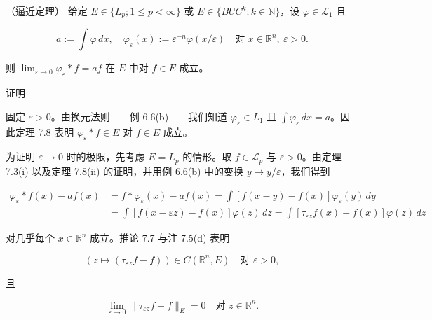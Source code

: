 \begin{theorem}

（逼近定理） 给定 $ E \in \{ L_{p} ; 1 \le p < \infty \} $ 或 $ E \in \{ BUC^{k} ; k \in \mathbb{N} \} $，设 $ \varphi \in \mathcal{L}_{1} $ 且

\[
a := \int \varphi\,dx , \quad \varphi_{\varepsilon}(x) := \varepsilon^{-n}\varphi(x/\varepsilon) \quad \text{对 } x \in \mathbb{R}^{n} , \ \varepsilon > 0 .
\]

则 $ \lim_{\varepsilon \to 0}\varphi_{\varepsilon} * f = af $ 在 $ E $ 中对 $ f \in E $ 成立。

证明

\begin{subitems}
\item

固定 $ \varepsilon > 0 $。由换元法则——例 6.6(b)——我们知道 $ \varphi_{\varepsilon} \in L_{1} $ 且 $ \int \varphi_{\varepsilon}\,dx = a $。因此定理 7.8 表明 $ \varphi_{\varepsilon} * f \in E $ 对 $ f \in E $ 成立。

\item

为证明 $ \varepsilon \to 0 $ 时的极限，先考虑 $ E = L_{p} $ 的情形。取 $ f \in \mathcal{L}_{p} $ 与 $ \varepsilon > 0 $。由定理 7.3(i) 以及定理 7.8(ii) 的证明，并用例 6.6(b) 中的变换 $ y \mapsto y/\varepsilon $，我们得到

\begin{equation}
\begin{aligned}
\varphi_{\varepsilon} * f(x) - af(x) &= f * \varphi_{\varepsilon}(x) - af(x) = \int [f(x-y) - f(x)]\varphi_{\varepsilon}(y)\,dy \\ &= \int [f(x-\varepsilon z) - f(x)]\varphi(z)\,dz = \int [\tau_{\varepsilon z}f(x) - f(x)]\varphi(z)\,dz
\end{aligned}\tag{7.7}
\end{equation}

对几乎每个 $ x \in \mathbb{R}^{n} $ 成立。推论 7.7 与注 7.5(d) 表明

\begin{equation}
(z \mapsto (\tau_{\varepsilon z}f - f)) \in C(\mathbb{R}^{n},E) \quad \text{对 } \varepsilon > 0 ,\tag{7.8}
\end{equation}

且

\begin{equation}
\lim_{\varepsilon \to 0}\|\tau_{\varepsilon z}f - f\|_{E} = 0 \quad \text{对 } z \in \mathbb{R}^{n} .\tag{7.9}
\end{equation}


\end{subitems}
\end{theorem}
